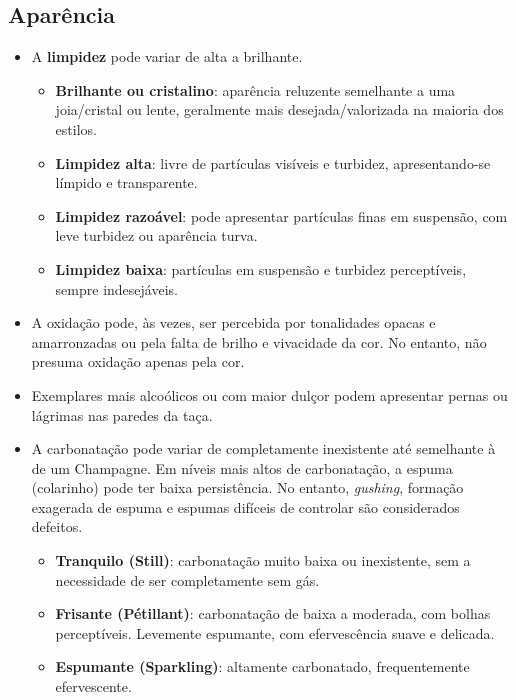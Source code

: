 
\subsection*{Aparência}

\begin{itemize}
\item A \textbf{limpidez} pode variar de alta a brilhante.
\begin{itemize}
\item \textbf{Brilhante ou cristalino}: aparência reluzente semelhante a uma joia/cristal ou lente, geralmente mais desejada/valorizada na maioria dos estilos.
\item \textbf{Limpidez alta}: livre de partículas visíveis e turbidez, apresentando-se límpido e transparente.
\item \textbf{Limpidez razoável}: pode apresentar partículas finas em suspensão, com leve turbidez ou aparência turva.
\item \textbf{Limpidez baixa}: partículas em suspensão e turbidez perceptíveis, sempre indesejáveis.
\end{itemize}
\item A oxidação pode, às vezes, ser percebida por tonalidades opacas e amarronzadas ou pela falta de brilho e vivacidade da cor. No entanto, não presuma oxidação apenas pela cor.
\item Exemplares mais alcoólicos ou com maior dulçor podem apresentar pernas ou lágrimas nas paredes da taça.
\item A carbonatação pode variar de completamente inexistente até semelhante à de um Champagne. Em níveis mais altos de carbonatação, a espuma (colarinho) pode ter baixa persistência. No entanto, \textit{gushing}, formação exagerada de espuma e espumas difíceis de controlar são considerados defeitos.
\begin{itemize}
\item \textbf{Tranquilo (Still)}: carbonatação muito baixa ou inexistente, sem a necessidade de ser completamente sem gás.
\item \textbf{Frisante (Pétillant)}: carbonatação de baixa a moderada, com bolhas perceptíveis. Levemente espumante, com efervescência suave e delicada.
\item \textbf{Espumante (Sparkling)}: altamente carbonatado, frequentemente efervescente.
\end{itemize}
\end{itemize}